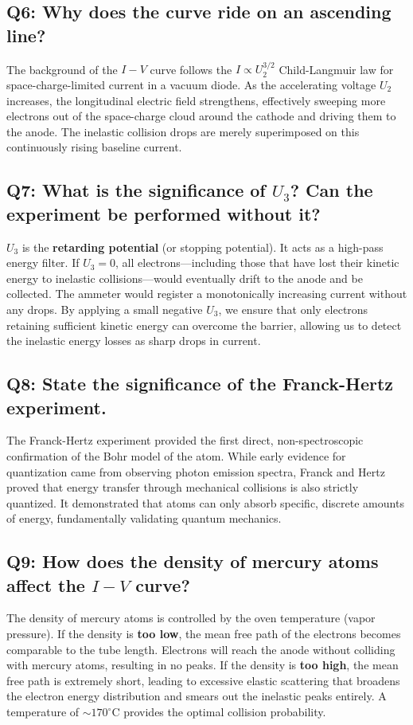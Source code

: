 \documentclass[a4paper,11pt]{article}
\begin{document}
\subsection*{Q6: Why does the curve ride on an ascending line?}
The background of the $I-V$ curve follows the $I \propto U_2^{3/2}$ Child-Langmuir law for space-charge-limited current in a vacuum diode. As the accelerating voltage $U_2$ increases, the longitudinal electric field strengthens, effectively sweeping more electrons out of the space-charge cloud around the cathode and driving them to the anode. The inelastic collision drops are merely superimposed on this continuously rising baseline current.

\subsection*{Q7: What is the significance of $U_3$? Can the experiment be performed without it?}
$U_3$ is the \textbf{retarding potential} (or stopping potential). It acts as a high-pass energy filter. If $U_3 = 0$, all electrons—including those that have lost their kinetic energy to inelastic collisions—would eventually drift to the anode and be collected. The ammeter would register a monotonically increasing current without any drops. By applying a small negative $U_3$, we ensure that only electrons retaining sufficient kinetic energy can overcome the barrier, allowing us to detect the inelastic energy losses as sharp drops in current.

\subsection*{Q8: State the significance of the Franck-Hertz experiment.}
The Franck-Hertz experiment provided the first direct, non-spectroscopic confirmation of the Bohr model of the atom. While early evidence for quantization came from observing photon emission spectra, Franck and Hertz proved that energy transfer through mechanical collisions is also strictly quantized. It demonstrated that atoms can only absorb specific, discrete amounts of energy, fundamentally validating quantum mechanics.

\subsection*{Q9: How does the density of mercury atoms affect the $I-V$ curve?}
The density of mercury atoms is controlled by the oven temperature (vapor pressure). If the density is \textbf{too low}, the mean free path of the electrons becomes comparable to the tube length. Electrons will reach the anode without colliding with mercury atoms, resulting in no peaks. If the density is \textbf{too high}, the mean free path is extremely short, leading to excessive elastic scattering that broadens the electron energy distribution and smears out the inelastic peaks entirely. A temperature of $\sim 170^\circ\text{C}$ provides the optimal collision probability.
\end{document}

